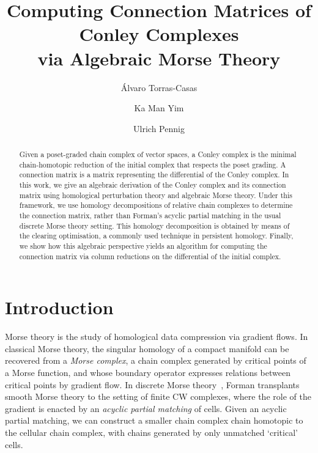 \documentclass[11pt, table, nothms]{amsart}
\theoremstyle{definition}
\begin{document}


\title{Computing Connection Matrices of Conley Complexes \\ via Algebraic Morse Theory}
\author{\'Alvaro Torras-Casas}
\address{Departamento de Matem\'atica Aplicada I, Universidad de Sevilla, España}

\author{Ka Man Yim}
\address{School of Mathematics, Cardiff University, UK}

\author{Ulrich Pennig}
\address{School of Mathematics, Cardiff University, UK}


\begin{abstract} 
    Given a poset-graded chain complex of vector spaces, a Conley complex is the minimal chain-homotopic reduction of the initial complex that respects the poset grading. A connection matrix is a matrix representing  the differential of the Conley complex.
    In this work, we give an algebraic derivation of the Conley complex and its connection matrix using homological perturbation theory and algebraic Morse theory.
    Under this framework, we use homology decompositions of relative chain complexes to determine the connection matrix, rather than Forman's acyclic partial matching in the usual discrete Morse theory setting. 
    This homology decomposition is obtained by means of the clearing optimisation, a commonly used technique in persistent homology.
    Finally, we show how this algebraic perspective yields an algorithm for computing the connection matrix via column reductions on the differential of the initial complex. 
\end{abstract}

\maketitle

\section{Introduction}

Morse theory is the study of homological data compression via gradient flows. In classical Morse theory, the singular homology of a compact manifold can be recovered from a \emph{Morse complex}, a chain complex generated by critical points of a Morse function, and whose boundary operator expresses relations between critical points by gradient flow. 
In discrete Morse theory~\cite{Forman1998MorseComplexes}, Forman transplants smooth Morse theory to the setting of finite CW complexes, where the role of the gradient {is enacted by} an \emph{acyclic partial matching} of cells. 
Given an acyclic partial matching, we can construct a smaller chain complex chain homotopic to the cellular chain complex, with chains generated by only unmatched `critical' cells.
\end{document}
